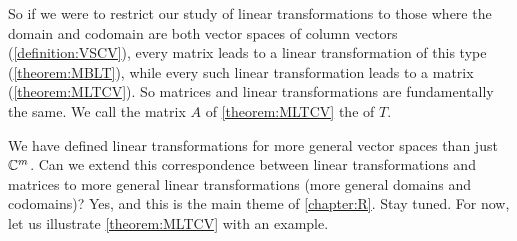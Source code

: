 \documentclass{ximera}
\begin{document}
So if we were to restrict our study of linear transformations to those where the domain and codomain are both vector spaces of column vectors (\ref{definition:VSCV}), every matrix leads to a linear transformation of this type (\ref{theorem:MBLT}), while every such linear transformation leads to a matrix (\ref{theorem:MLTCV}).  So matrices and linear transformations are fundamentally the same.  We call the matrix $A$ of \ref{theorem:MLTCV} the  of $T$.



We have defined linear transformations for more general vector spaces than just $\mathbb{C}^{m}$. Can we extend this correspondence between linear transformations and matrices to more general linear transformations (more general domains and codomains)?  Yes, and this is the main theme of \ref{chapter:R}.  Stay tuned.  For now, let us illustrate \ref{theorem:MLTCV} with an example.
\end{document}
